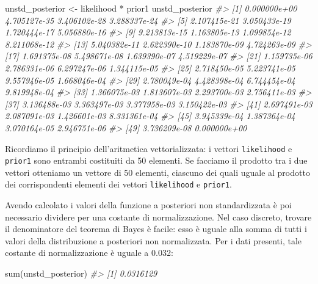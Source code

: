 \documentclass[
]{memoir}
\newenvironment{Shaded}{\begin{snugshade}}{\end{snugshade}}
\newcommand{\CommentTok}[1]{\textcolor[rgb]{0.56,0.35,0.01}{\textit{#1}}}
\newcommand{\FunctionTok}[1]{\textcolor[rgb]{0.00,0.00,0.00}{#1}}
\newcommand{\NormalTok}[1]{#1}
\newcommand{\OtherTok}[1]{\textcolor[rgb]{0.56,0.35,0.01}{#1}}
\newcommand{\SpecialCharTok}[1]{\textcolor[rgb]{0.00,0.00,0.00}{#1}}
\begin{document}
\begin{Shaded}
\begin{Highlighting}[]
\NormalTok{unstd\_posterior }\OtherTok{\textless{}{-}}\NormalTok{ likelihood }\SpecialCharTok{*}\NormalTok{ prior1}
\NormalTok{unstd\_posterior}
\CommentTok{\#\textgreater{}  [1] 0.000000e+00 4.705127e{-}35 3.406102e{-}28 3.288337e{-}24}
\CommentTok{\#\textgreater{}  [5] 2.107415e{-}21 3.050433e{-}19 1.720444e{-}17 5.056880e{-}16}
\CommentTok{\#\textgreater{}  [9] 9.213813e{-}15 1.163805e{-}13 1.099854e{-}12 8.211068e{-}12}
\CommentTok{\#\textgreater{} [13] 5.040382e{-}11 2.622390e{-}10 1.183870e{-}09 4.724263e{-}09}
\CommentTok{\#\textgreater{} [17] 1.691375e{-}08 5.498671e{-}08 1.639390e{-}07 4.519229e{-}07}
\CommentTok{\#\textgreater{} [21] 1.159735e{-}06 2.786331e{-}06 6.297247e{-}06 1.344115e{-}05}
\CommentTok{\#\textgreater{} [25] 2.718450e{-}05 5.223741e{-}05 9.557946e{-}05 1.668046e{-}04}
\CommentTok{\#\textgreater{} [29] 2.780049e{-}04 4.428398e{-}04 6.744454e{-}04 9.819948e{-}04}
\CommentTok{\#\textgreater{} [33] 1.366075e{-}03 1.813607e{-}03 2.293700e{-}03 2.756411e{-}03}
\CommentTok{\#\textgreater{} [37] 3.136488e{-}03 3.363497e{-}03 3.377958e{-}03 3.150422e{-}03}
\CommentTok{\#\textgreater{} [41] 2.697491e{-}03 2.087091e{-}03 1.426601e{-}03 8.331361e{-}04}
\CommentTok{\#\textgreater{} [45] 3.945339e{-}04 1.387364e{-}04 3.070164e{-}05 2.946751e{-}06}
\CommentTok{\#\textgreater{} [49] 3.736209e{-}08 0.000000e+00}
\end{Highlighting}
\end{Shaded}

Ricordiamo il principio dell'aritmetica vettorializzata: i vettori \texttt{likelihood} e \texttt{prior1} sono entrambi costituiti da 50 elementi. Se facciamo il prodotto tra i due vettori otteniamo un vettore di 50 elementi, ciascuno dei quali uguale al prodotto dei corrispondenti elementi dei vettori \texttt{likelihood} e \texttt{prior1}.

Avendo calcolato i valori della funzione a posteriori non standardizzata è poi necessario dividere per una costante di normalizzazione. Nel caso discreto, trovare il denominatore del teorema di Bayes è facile: esso è uguale alla somma di tutti i valori della distribuzione a posteriori non normalizzata. Per i dati presenti, tale costante di normalizzazione è uguale a 0.032:

\begin{Shaded}
\begin{Highlighting}[]
\FunctionTok{sum}\NormalTok{(unstd\_posterior)}
\CommentTok{\#\textgreater{} [1] 0.0316129}
\end{Highlighting}
\end{Shaded}
\end{document}
